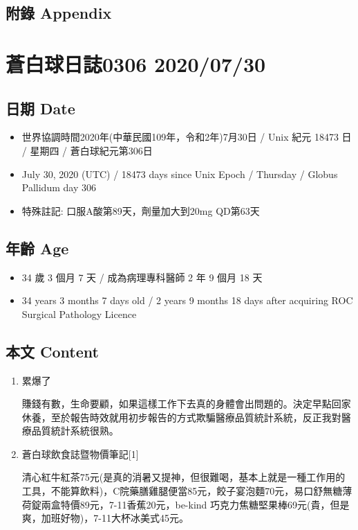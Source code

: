 \documentclass[
]{article}
\providecommand{\tightlist}{%
  \setlength{\itemsep}{0pt}\setlength{\parskip}{0pt}}
\begin{document}
\hypertarget{ux9644ux9304-appendix-24}{%
\subsection{附錄 Appendix}\label{ux9644ux9304-appendix-24}}

\hypertarget{ux84bcux767dux7403ux65e5ux8a8c0306-20200730}{%
\section{蒼白球日誌0306
2020/07/30}\label{ux84bcux767dux7403ux65e5ux8a8c0306-20200730}}

\hypertarget{ux65e5ux671f-date-25}{%
\subsection{日期 Date}\label{ux65e5ux671f-date-25}}

\begin{itemize}
\tightlist
\item
  世界協調時間2020年(中華民國109年，令和2年)7月30日 / Unix 紀元 18473 日
  / 星期四 / 蒼白球紀元第306日
\item
  July 30, 2020 (UTC) / 18473 days since Unix Epoch / Thursday / Globus
  Pallidum day 306
\item
  特殊註記: 口服A酸第89天，劑量加大到20mg QD第63天
\end{itemize}

\hypertarget{ux5e74ux9f61-age-25}{%
\subsection{年齡 Age}\label{ux5e74ux9f61-age-25}}

\begin{itemize}
\tightlist
\item
  34 歲 3 個月 7 天 / 成為病理專科醫師 2 年 9 個月 18 天
\item
  34 years 3 months 7 days old / 2 years 9 months 18 days after
  acquiring ROC Surgical Pathology Licence
\end{itemize}

\hypertarget{ux672cux6587-content-25}{%
\subsection{本文 Content}\label{ux672cux6587-content-25}}

\begin{enumerate}
\def\labelenumi{\arabic{enumi}.}
\item
  累爆了

  賺錢有數，生命要顧，如果這樣工作下去真的身體會出問題的。決定早點回家休養，至於報告時效就用初步報告的方式欺騙醫療品質統計系統，反正我對醫療品質統計系統很熟。
\item
  蒼白球飲食誌暨物價筆記{[}1{]}

  清心紅牛紅茶75元(是真的消暑又提神，但很難喝，基本上就是一種工作用的工具，不能算飲料)，C院藥膳雞腿便當85元，餃子宴泡麵70元，易口舒無糖薄荷錠兩盒特價89元，7-11香蕉20元，be-kind
  巧克力焦糖堅果棒69元(貴，但是爽，加班好物)，7-11大杯冰美式45元。
\end{enumerate}
\end{document}
